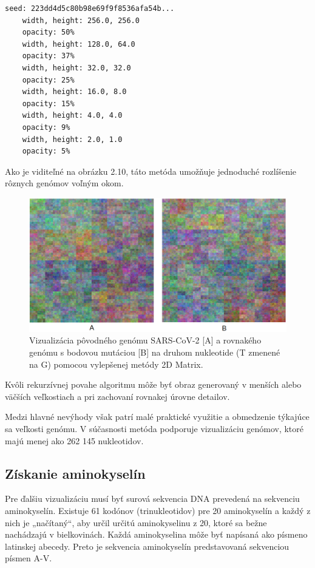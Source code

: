 \begin{lstlisting}[caption=Výstup z konzoly vyrobený počas vizualizácie pomocou vylepšenej metódy 2D Matrix.]
    seed: 223dd4d5c80b98e69f9f8536afa54b...
    width, height: 256.0, 256.0
    opacity: 50%
    width, height: 128.0, 64.0
    opacity: 37%
    width, height: 32.0, 32.0
    opacity: 25%
    width, height: 16.0, 8.0
    opacity: 15%
    width, height: 4.0, 4.0
    opacity: 9%
    width, height: 2.0, 1.0
    opacity: 5%
\end{lstlisting}

Ako je viditeľné na obrázku 2.10, táto metóda umožňuje jednoduché rozlíšenie rôznych genómov voľným okom.

\begin{figure}[!ht]
	\centering
	\includegraphics[width=1\textwidth]{figures/2dim.png}
	\caption{Vizualizácia pôvodného genómu SARS-CoV-2 [A] a rovnakého genómu s bodovou mutáciou [B] na druhom nukleotide (T zmenené na G) pomocou vylepšenej metódy 2D Matrix.\label{o:latex_friendly_zone}}
\end{figure}

Kvôli rekurzívnej povahe algoritmu môže byť obraz generovaný v menších alebo väčších veľkostiach a pri zachovaní rovnakej úrovne detailov.

Medzi hlavné nevýhody však patrí malé praktické využitie a obmedzenie týkajúce sa veľkosti genómu.
V súčasnosti metóda podporuje vizualizáciu genómov, ktoré majú menej ako 262 145 nukleotidov.

\subsection{Získanie aminokyselín}

Pre ďalšiu vizualizáciu musí byť surová sekvencia DNA prevedená na sekvenciu aminokyselín.
Existuje 61 kodónov (trinukleotidov) pre 20 aminokyselín a každý z nich je „načítaný“, aby určil určitú aminokyselinu z 20, ktoré sa bežne nachádzajú v bielkovinách.
Každá aminokyselina môže byť napísaná ako písmeno latinskej abecedy.
Preto je sekvencia aminokyselín predstavovaná sekvenciou písmen A-V.

